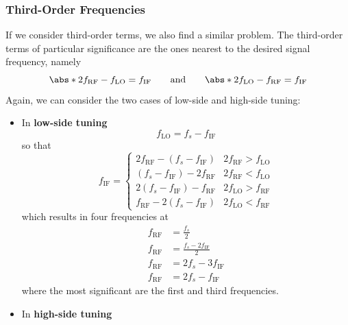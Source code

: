 \documentclass{article}
\begin{document}
\subsubsection{Third-Order Frequencies}
If we consider third-order terms, we also find a similar problem. The
third-order terms of particular significance are the ones nearest to
the desired signal frequency, namely
\begin{equation*}
    \abs*{2 f_{\mathrm{RF}} - f_{\mathrm{LO}}} = f_{\mathrm{IF}} \qquad \text{and} \qquad \abs*{2 f_{\mathrm{LO}} - f_{\mathrm{RF}}} = f_{\mathrm{IF}}
\end{equation*}
Again, we can consider the two cases of low-side and high-side tuning:
\begin{itemize}
    \item In \textbf{low-side tuning}
          \begin{equation*}
              f_{\mathrm{LO}} = f_s - f_{\mathrm{IF}}
          \end{equation*}
          so that
          \begin{equation*}
              f_{\mathrm{IF}} =
              \begin{cases}
                  2 f_{\mathrm{RF}} - \left( f_s - f_{\mathrm{IF}} \right) & 2 f_{\mathrm{RF}} > f_{\mathrm{LO}} \\
                  \left( f_s - f_{\mathrm{IF}} \right) - 2 f_{\mathrm{RF}} & 2 f_{\mathrm{RF}} < f_{\mathrm{LO}} \\
                  2 \left( f_s - f_{\mathrm{IF}} \right) - f_{\mathrm{RF}} & 2 f_{\mathrm{LO}} > f_{\mathrm{RF}} \\
                  f_{\mathrm{RF}} - 2 \left( f_s - f_{\mathrm{IF}} \right) & 2 f_{\mathrm{LO}} < f_{\mathrm{RF}}
              \end{cases}
          \end{equation*}
          which results in four frequencies at
          \begin{align*}
              f_{\mathrm{RF}} & = \frac{f_s}{2}                     \\
              f_{\mathrm{RF}} & = \frac{f_s - 2 f_{\mathrm{IF}}}{2} \\
              f_{\mathrm{RF}} & = 2 f_s - 3 f_{\mathrm{IF}}         \\
              f_{\mathrm{RF}} & = 2 f_s - f_{\mathrm{IF}}
          \end{align*}
          where the most significant are the first and third frequencies.
    \item In \textbf{high-side tuning}

\end{itemize}
\end{document}

